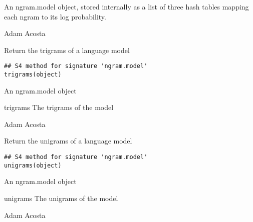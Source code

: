 \documentclass[letterpaper]{book}
\begin{document}
%
\begin{Value}
An ngram.model object, stored internally as a list of three hash
tables mapping each ngram to its log probability.
\end{Value}
%
\begin{Author}\relax
Adam Acosta
\end{Author}
%
\begin{Description}\relax
Return the trigrams of a language model
\end{Description}
%
\begin{Usage}
\begin{verbatim}
## S4 method for signature 'ngram.model'
trigrams(object)
\end{verbatim}
\end{Usage}
%
\begin{Arguments}
\begin{ldescription}
\item[\code{object}] An ngram.model object
\end{ldescription}
\end{Arguments}
%
\begin{Value}
trigrams The trigrams of the model
\end{Value}
%
\begin{Author}\relax
Adam Acosta
\end{Author}
%
\begin{Description}\relax
Return the unigrams of a language model
\end{Description}
%
\begin{Usage}
\begin{verbatim}
## S4 method for signature 'ngram.model'
unigrams(object)
\end{verbatim}
\end{Usage}
%
\begin{Arguments}
\begin{ldescription}
\item[\code{object}] An ngram.model object
\end{ldescription}
\end{Arguments}
%
\begin{Value}
unigrams The unigrams of the model
\end{Value}
%
\begin{Author}\relax
Adam Acosta
\end{Author}
\printindex{}
\end{document}
